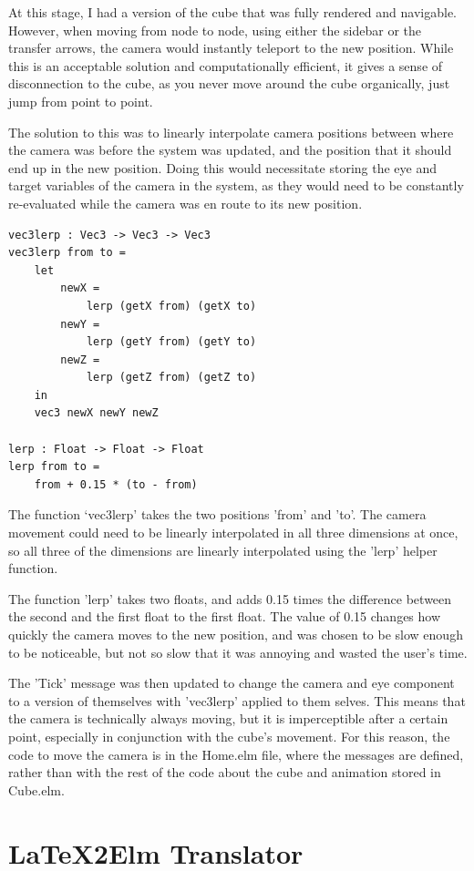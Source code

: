 \documentclass{l4proj}
\begin{document}
At this stage, I had a version of the cube that was fully rendered and navigable.  However, when moving from node to node, using either the sidebar or the transfer arrows, the camera would instantly teleport to the new position.  While this is an acceptable solution and computationally efficient, it gives a sense of disconnection to the cube, as you never move around the cube organically, just jump from point to point.

The solution to this was to linearly interpolate camera positions between where the camera was before the system was updated, and the position that it should end up in the new position.  Doing this would necessitate storing the eye and target variables of the camera in the system, as they would need to be constantly re-evaluated while the camera was en route to its new position.

\begin{lstlisting}
vec3lerp : Vec3 -> Vec3 -> Vec3
vec3lerp from to =
    let
        newX =
            lerp (getX from) (getX to)
        newY =
            lerp (getY from) (getY to)
        newZ =
            lerp (getZ from) (getZ to)
    in
    vec3 newX newY newZ

lerp : Float -> Float -> Float
lerp from to =
    from + 0.15 * (to - from)
\end{lstlisting}

The function `vec3lerp' takes the two positions 'from' and 'to'.  The camera movement could need to be linearly interpolated in all three dimensions at once, so all three of the dimensions are linearly interpolated using the 'lerp' helper function.

The function 'lerp' takes two floats, and adds 0.15 times the difference between the second and the first float to the first float.  The value of 0.15 changes how quickly the camera moves to the new position, and was chosen to be slow enough to be noticeable, but not so slow that it was annoying and wasted the user's time.

The 'Tick' message was then updated to change the camera and eye component to a version of themselves with 'vec3lerp' applied to them selves.  This means that the camera is technically always moving, but it is imperceptible after a certain point, especially in conjunction with the cube's movement.  For this reason, the code to move the camera is in the Home.elm file, where the messages are defined, rather than with the rest of the code about the cube and animation stored in Cube.elm.

\section{LaTeX2Elm Translator}
\end{document}

